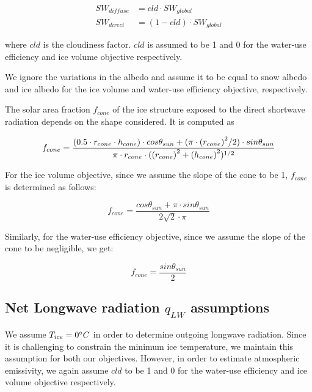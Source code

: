 \documentclass[tc, manuscript]{copernicus}
\begin{document}
\begin{equation}
\begin{split}
  SW_{diffuse} &= cld \cdot SW_{global}\\
  SW_{direct} &= (1-cld) \cdot SW_{global}
\end{split}
\end{equation}

where $cld$ is the cloudiness factor. $cld$ is assumed to be 1 and 0 for the water-use efficiency and ice volume
objective respectively.

We ignore the variations in the albedo and assume it to be equal to snow albedo and ice albedo for the  ice
volume and water-use efficiency objective, respectively.

The solar area fraction $f_{cone}$ of the ice structure exposed to the direct shortwave radiation depends on the
shape considered. It is computed as

\begin{equation}
		f_{cone} =\frac{(0.5 \cdot r_{cone} \cdot h_{cone}) \cdot cos \theta_{sun} +(\pi \cdot
			{(r_{cone})}^2/2) \cdot sin \theta_{sun} }{\pi \cdot r_{cone} \cdot ({(r_{cone})}^2+{(h_{cone})}^2)^{1/2}}\\
\end{equation}

For the ice volume objective, since we assume the slope of the cone to be 1, $f_{cone}$ is determined as follows:

\begin{equation}
		f_{cone} =\frac{ cos \theta_{sun} + \pi \cdot sin \theta_{sun} }{2\sqrt{2} \cdot \pi }
\end{equation}

Similarly, for the water-use efficiency objective, since we assume the slope of the cone to be negligible, we get:

\begin{equation}
		f_{cone} =\frac{ sin \theta_{sun} }{2 }
\end{equation}

\subsection{Net Longwave radiation \texorpdfstring{$q_{LW}$}{Lg} assumptions} 

We assume $T_{ice} = 0 ^{\circ} C$ in order to determine outgoing longwave radiation. Since it is challenging to
constrain the minimum ice temperature, we maintain this assumption for both our objectives. However, in order to
estimate atmospheric emissivity, we again assume $cld$ to be 1 and 0 for the water-use efficiency and ice volume
objective respectively.
\end{document}
